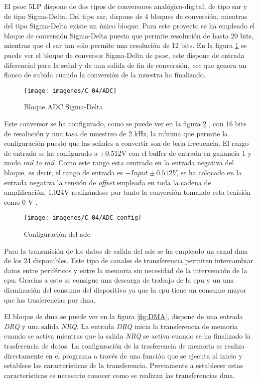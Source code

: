 El \acrshort{psoc} 5LP dispone de dos tipos de conversores analógico-digital, de tipo \acrshort{sar} y de tipo Sigma-Delta. Del tipo \acrshort{sar}, dispone de 4 bloques de conversión, mientras del tipo Sigma-Delta existe un único bloque. Para este proyecto se ha empleado el bloque de conversión Sigma-Delta puesto que permite resolución de hasta 20 bits, mientras que el \acrshort{sar} tan solo permite una resolución de 12 bits. En la figura \ref{fig:adc_bloq} se puede ver el bloque de conversor Sigma-Delta de \acrshort{psoc}, este dispone de entrada diferencial para la señal y de una salida de fin de conversión, \textit{eoc} que genera un flanco de subida cuando la conversión de la muestra ha finalizado.

\begin{figure}[!ht]
	\center
	\texttt{[image: imagenes/C\_04/ADC]}
	\caption{Bloque ADC Sigma-Delta}
	\label{fig:adc_bloq}
\end{figure}

Este conversor se ha configurado, como se puede ver en la figura \ref{fig:adc_config} , con 16 bits de resolución y una tasa de muestreo de 2 kHz, la mínima que permite la configuración puesto que las señales a convertir son de baja frecuencia. El rango de entrada se ha configurado a $\pm$0.512V con el buffer de entrada en ganancia 1 y modo \textit{rail to rail}. Como este rango esta centrado en la entrada negativa del bloque, es decir, el rango de entrada es $-Input \pm 0.512V$, se ha colocado en la entrada negativa la tensión de \textit{offset} empleada en toda la cadena de amplificación, 1.024V realizándose por tanto la conversión tomando esta tenisión como 0 V \cite{CY_ADC_dat}.

\begin{figure}[!ht]
	\center
	\texttt{[image: imagenes/C\_04/ADC\_config]}
	\caption{Configuración del \acrshort{adc}}
	\label{fig:adc_config}
\end{figure}


Para la transmisión de los datos de salida del \acrshort{adc} se ha empleado un canal \acrshort{dma} de los 24 disponibles. Este tipo de canales de transferencia permiten intercambiar datos entre periféricos y entre la memoria sin necesidad de la intervención de la  \acrshort{cpu}. Gracias a esto se consigue una descarga de trabajo de la \acrshort{cpu} y un una disminución del consumo del dispositivo ya que la \acrshort{cpu} tiene un consumo mayor que las trasferencias por \acrshort{dma}.

El bloque de \acrshort{dma} se puede ver en la figura \ref{fig:DMA}, dispone de una entrada \textit{DRQ} y una salida \textit{NRQ}. La entrada \textit{DRQ} inicia la transferencia de memoria cuando se activa mientras que la salida \textit{NRQ} se activa cuando se ha finalizado la trasferencia de datos. La configuración de la trasferencia de memoria se realiza directamente en el programa a través de una función que se ejecuta al inicio y establece las características de la transferencia. Previamente a establecer estas características es necesario conocer como se realizan las transferencias \acrshort{dma}.

